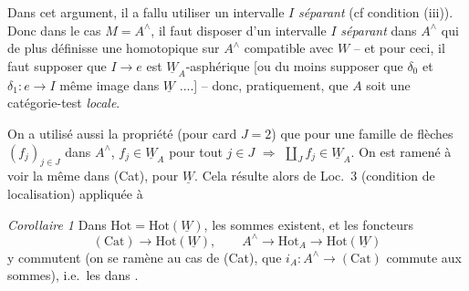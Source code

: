 \documentclass[11pt,a4paper]{article}
\begin{document}
Dans cet argument, il a fallu  utiliser un intervalle $I$ \emph{séparant} (cf condition
(iii)). Donc dans le cas $M = A^{\wedge}$, il faut disposer d'un intervalle
$I$ \emph{séparant} dans $A^{\wedge}$  qui de plus
définisse une \struck{\ill{}}  homotopique sur $A^{\wedge}$ 
compatible avec $W$ -- et pour ceci, il faut supposer que $I \to e$ est
$\underline{W}_A$-asphérique [ou du moins supposer que $\delta_0$ et
$\delta_1 : e \to I$ \struck{\ill{}} \emph{\ill{}}  \struck{\ill{}} même image dans
$\underline{W}$ ....] -- donc, pratiquement, que \struck{\ill{}} $A$ soit
une catégorie-test \emph{locale}.

On a utilisé aussi la propriété (pour card $J = 2$) que pour une famille de
flèches $(f_j)_{j \in J}$ dans $A^{\wedge}$, $f_j \in \underline{W}_A$ pour
tout $j \in J$ $\Rightarrow$ $\coprod_J f_j \in \underline{W}_A$. On est
ramené à voir la même dans (Cat), pour $\underline{W}$. Cela résulte alors
de Loc.\ 3 (condition de localisation) appliquée à




\emph{Corollaire 1} Dans $\mathrm{Hot} = \mathrm{Hot}(\underline{W})$, les
sommes \struck{\ill{}}  existent, et les foncteurs
\[
  (\mathrm{Cat}) \to \mathrm{Hot}(\underline{W}), \qquad
  A^{\wedge} \to \mathrm{Hot}_A \to \mathrm{Hot}(\underline{W})
\]
y commutent (on se ramène au cas de (Cat),  que
$i_A : A^{\wedge} \to (\mathrm{Cat})$ commute aux sommes), i.e.\ les
\emph{\ill{}} dans \ill{} \ill{}.
\end{document}
